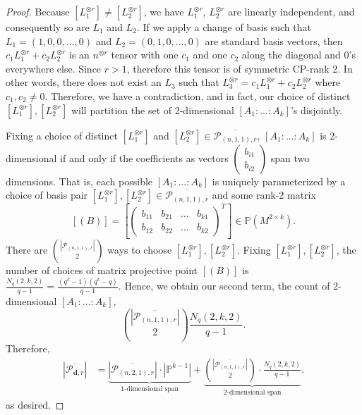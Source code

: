 \documentclass[10pt,a4paper]{amsart}
\newcommand{\dd}{\mathbf{d}}    %
\begin{document}
\begin{proof}
        Because $\left[L_1^{\otimes r}\right] \neq \left[L_2^{\otimes r}\right]$, we have $L_1^{\otimes r}$, $L_2^{\otimes r}$ are linearly independent, and consequently so are $L_1$ and $L_2$. If we apply a change of basis such that $L_1 = (1, 0, 0, ..., 0)$ and $L_2 = (0, 1, 0, ..., 0)$ are standard basis vectors, then $c_1L_1^{\otimes r} + c_2L_2^{\otimes r}$ is an $n^{\otimes r}$ tensor with one $c_1$ and one $c_2$ along the diagonal and 0's everywhere else. Since $r > 1$, therefore this tensor is of symmetric CP-rank 2. In other words, there does not exist an $L_3$ such that $L_3^{\otimes r} = c_1L_1^{\otimes r} + c_2L_2^{\otimes r}$ where $c_1, c_2 \neq 0$. Therefore, we have a contradiction, and in fact, our choice of distinct $\left[L_1^{\otimes r}\right],\left[L_2^{\otimes r}\right]$ will partition the set of 2-dimensional $\left[A_1:...:A_k\right]$'s disjointly.
        
        Fixing a choice of distinct $\left[L_1^{\otimes r}\right]$ and $\left[L_2^{\otimes r}\right] \in \overline{\mathcal{P}_{(n,1,1),r}}$, $\left[A_1:...:A_k\right]$ is 2-dimensional if and only if the coefficients as vectors $\left(\begin{array}{c} b_{i1} \\ b_{i2}\end{array}\right)$ span two dimensions. That is, each possible $\left[A_1:...:A_k\right]$ is uniquely parameterized by a choice of basis pair $\left[L_1^{\otimes r}\right], \left[L_2^{\otimes r}\right] \in \overline{\mathcal{P}_{(n,1,1),r}}$ and some rank-2 matrix
        \[
        \left[(B)\right] = \left[\left(\begin{array}{cccc}
            b_{11} & b_{21} & \hdots & b_{k1} \\
            b_{12} & b_{22} & \hdots & b_{k2} 
        \end{array}\right)^T\right] \in \mathbb{P}(M^{2 \times k}).
        \]
        There are $\binom{\left|\overline{\mathcal{P}_{(n,1,1), r}}\right|}{2}$ ways to choose $\left[L_1^{\otimes r}\right],\left[L_2^{\otimes r}\right]$. Fixing $\left[L_1^{\otimes r}\right],\left[L_2^{\otimes r}\right]$, the number of choices of matrix projective point $\left[(B)\right]$ is $\frac{N_{q}(2,k,2)}{q - 1} = \frac{(q^k - 1)(q^k - q)}{q-1}$. Hence, we obtain our second term, the count of 2-dimensional $\left[A_1:...:A_k\right]$,
        \[
            \binom{\left|\overline{\mathcal{P}_{(n,1,1), r}}\right|}{2} \frac{N_{q}(2,k,2)}{q - 1}.
        \]
        Therefore,
        \begin{align*}
            \left|\overline{\mathcal{P}_{\dd, r}}\right| 
            &= \underbrace{\left|\overline{\mathcal{P}_{(n,2,1),r}}\right| \cdot \left|\mathbb{P}^{k-1}\right|}_{\text{$1$-dimensional span}}
            + \underbrace{\binom{\left|\overline{\mathcal{P}_{(n,1,1),r}}\right|}{2} \cdot \frac{N_q(2,k,2)}{q-1}}_{\text{$2$-dimensional span}}.
        \end{align*}
        as desired.
    \end{proof}
\end{document}
